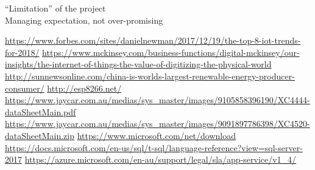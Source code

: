 \documentclass{article}
\begin{document}
        “Limitation” of the project\\
        Managing expectation, not over-promising

        \newpage

    \begin{thebibliography}{9}
        \raggedright
            \url{https://www.forbes.com/sites/danielnewman/2017/12/19/the-top-8-iot-trends-for-2018/}
            \url{https://www.mckinsey.com/business-functions/digital-mckinsey/our-insights/the-internet-of-things-the-value-of-digitizing-the-physical-world}
            \url{http://sunnewsonline.com/china-is-worlds-largest-renewable-energy-producer-consumer/}
            \url{http://esp8266.net/}
            \url{https://www.jaycar.com.au/medias/sys_master/images/9105858396190/XC4444-dataSheetMain.pdf}
            \url{https://www.jaycar.com.au/medias/sys_master/images/9091897786398/XC4520-dataSheetMain.zip}
            \url{https://www.microsoft.com/net/download}
            \url{https://docs.microsoft.com/en-us/sql/t-sql/language-reference?view=sql-server-2017}
            \url{https://azure.microsoft.com/en-au/support/legal/sla/app-service/v1_4/}
    \end{thebibliography}

    
\end{document}
